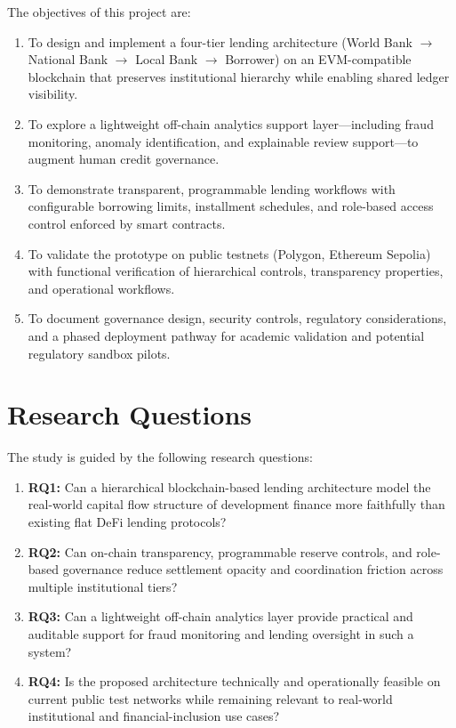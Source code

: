 \documentclass[12pt,a4paper]{report}
\begin{document}
The objectives of this project are:

\begin{enumerate}[noitemsep]
\item To design and implement a four-tier lending architecture (World Bank $\to$ National Bank $\to$ Local Bank $\to$ Borrower) on an EVM-compatible blockchain that preserves institutional hierarchy while enabling shared ledger visibility.
\item To explore a lightweight off-chain analytics support layer---including fraud monitoring, anomaly identification, and explainable review support---to augment human credit governance.
\item To demonstrate transparent, programmable lending workflows with configurable borrowing limits, installment schedules, and role-based access control enforced by smart contracts.
\item To validate the prototype on public testnets (Polygon, Ethereum Sepolia) with functional verification of hierarchical controls, transparency properties, and operational workflows.
\item To document governance design, security controls, regulatory considerations, and a phased deployment pathway for academic validation and potential regulatory sandbox pilots.
\end{enumerate}

\section{Research Questions}

The study is guided by the following research questions:

\begin{enumerate}[noitemsep]
\item \textbf{RQ1:} Can a hierarchical blockchain-based lending architecture model the real-world capital flow structure of development finance more faithfully than existing flat DeFi lending protocols?
\item \textbf{RQ2:} Can on-chain transparency, programmable reserve controls, and role-based governance reduce settlement opacity and coordination friction across multiple institutional tiers?
\item \textbf{RQ3:} Can a lightweight off-chain analytics layer provide practical and auditable support for fraud monitoring and lending oversight in such a system?
\item \textbf{RQ4:} Is the proposed architecture technically and operationally feasible on current public test networks while remaining relevant to real-world institutional and financial-inclusion use cases?
\end{enumerate}
\end{document}

